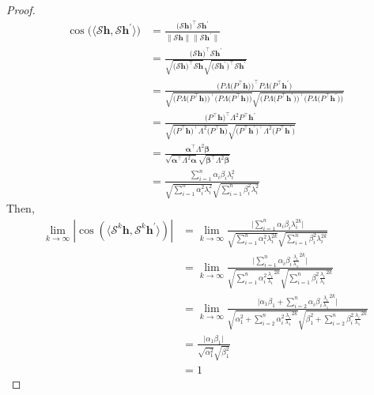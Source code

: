 \documentclass[nohyperref]{article}
\theoremstyle{plain}
\theoremstyle{definition}
\theoremstyle{remark}
\begin{document}
\begin{proof}
	\begin{equation}
		\nonumber
		\begin{aligned}
			\cos\bigl(\langle \mathcal S\bm h, \mathcal S\bm h^{\prime}\rangle\bigr)&=\frac{\bigl(\mathcal S\bm h\bigr)^{\top} \mathcal S\bm h^{\prime}}{\| \mathcal S\bm h\|\| \mathcal S\bm h^{\prime}\|}\\
			&=\frac{\bigl(\mathcal S\bm h\bigr)^{\top} \mathcal S\bm h^{\prime}}
			{\sqrt{\bigl(\mathcal S\bm h\bigr)^{\top} \mathcal S\bm h}\sqrt{\bigl(\mathcal S\bm h^{\prime}\bigr)^{\top} \mathcal S\bm h^{\prime}}}\\
			&=\frac{\bigl(P\Lambda\bigl(P^{\top}\bm h\bigr)\bigr)^{\top} P\Lambda\bigl(P^{\top}\bm h^{\prime}\bigr)}
			{\sqrt{\bigl(P\Lambda\bigl(P^{\top}\bm h\bigr)\bigr)^{\top}\bigl(P\Lambda\bigl(P^{\top}\bm h\bigr)\bigr)}\sqrt{\bigl(P\Lambda\bigl(P^{\top}\bm h^{\prime}\bigr)\bigr)^{\top}\bigl(P\Lambda\bigl(P^{\top}\bm h^{\prime}\bigr)\bigr)}}\\
			&=\frac{\bigl(P^{\top}\bm h\bigr)^{\top}\Lambda^2 P^{\top}\bm h^{\prime}}
			{\sqrt{\bigl(P^{\top}\bm h\bigr)^{\top}\Lambda^2\bigl(P^{\top}\bm h\bigr)}\sqrt{\bigl(P^{\top}\bm h^{\prime}\bigr)^{\top}\Lambda^2\bigl(P^{\top}\bm h^{\prime}\bigr)}}\\
			&=\frac{\boldsymbol\alpha^{\top}\Lambda^2\boldsymbol\beta}
			{\sqrt{\boldsymbol\alpha^{\top}\Lambda^2\boldsymbol\alpha}\sqrt{\boldsymbol\beta^{\top}\Lambda^2\boldsymbol\beta}}\\
			&=\frac{\sum^n_{i=1}\alpha_i\beta_i\lambda_i^2}{\sqrt{\sum^n_{i=1}\alpha_i^2\lambda_i^2}\sqrt{\sum^n_{i=1}\beta_i^2\lambda_i^2}}
		\end{aligned}
	\end{equation}
	Then, 
	\begin{equation}
		\nonumber
		\begin{aligned}
			\lim\limits_{k\rightarrow\infty}|\cos(\langle \mathcal S^k\bm h, \mathcal S^k\bm h^{\prime}\rangle)|&=\lim\limits_{k\rightarrow\infty}\frac{\bigl|\sum^n_{i=1}\alpha_i\beta_i\lambda_i^{2k}\bigr|}{\sqrt{\sum^n_{i=1}\alpha_i^2\lambda_i^{2k}}\sqrt{\sum^n_{i=1}\beta_i^2\lambda_i^{2k}}}\\
			&=\lim\limits_{k\rightarrow\infty}\frac{\bigl|\sum^n_{i=1}\alpha_i\beta_i\frac{\lambda_i}{\lambda_1}^{2k}\bigr|}{\sqrt{\sum^n_{i=1}\alpha_i^2\frac{\lambda_i}{\lambda_1}^{2k}}\sqrt{\sum^n_{i=1}\beta_i^2\frac{\lambda_i}{\lambda_1}^{2k}}}\\			&=\lim\limits_{k\rightarrow\infty}\frac{\bigl|\alpha_1\beta_1+\sum^n_{i=2}\alpha_i\beta_i\frac{\lambda_i}{\lambda_1}^{2k}\bigr|}{\sqrt{\alpha_1^2+\sum^n_{i=2}\alpha_i^2\frac{\lambda_i}{\lambda_1}^{2k}}\sqrt{\beta_1^2+\sum^n_{i=2}\beta_i^2\frac{\lambda_i}{\lambda_1}^{2k}}}\\
			&=\frac{\bigl|\alpha_1\beta_1\bigr|}{\sqrt{\alpha_1^2}\sqrt{\beta_1^2}}\\
			&=1
		\end{aligned}
	\end{equation}
\end{proof}
\end{document}

